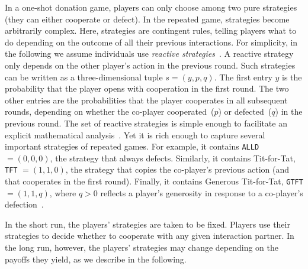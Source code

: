 \documentclass[11pt]{article}
\def\alld{\texttt{ALLD}}
\def\tft{\texttt{TFT}}
\def\gtft{\texttt{GTFT}}
\def\strategy{s}
\theoremstyle{plainCl1}
\theoremstyle{plainCl2}
\begin{document}

In a one-shot donation game, players can only choose among two pure strategies (they can either cooperate or defect).
In the repeated game, strategies become arbitrarily complex. 
Here, strategies are contingent rules, telling players what to do depending on the outcome of all their previous interactions. 
For simplicity, in the following we assume individuals use {\it reactive strategies}~\citep{Nowak1992tit}. 
A reactive strategy only depends on the other player's action in the previous round. 
Such strategies can be written as a three-dimensional tuple \(\strategy=(y, p,q)\).
The first entry \(y\) is the probability that the player opens with cooperation in the first round. 
The two other entries are the probabilities that the player cooperates in all subsequent rounds, depending on whether the co-player cooperated~($p$) or defected~($q$) in the previous round. 
The set of reactive strategies is simple enough to facilitate an explicit mathematical analysis~\citep{hofbauer1998evolutionary}. 
Yet it is rich enough to capture several important strategies of repeated games. 
For example, it contains \alld{} $=\!(0,0,0)$, the strategy that always defects. 
Similarly, it contains Tit-for-Tat, \tft{} $=\!(1,1,0)$, the strategy that copies the co-player's previous action (and that cooperates in the first round). 
Finally, it contains Generous Tit-for-Tat, \gtft $=\!(1,1,q)$, where $q\!>\!0$ reflects a player's generosity in response to a co-player's defection~\citep{molander:jcr:1985,Nowak1992tit}.  

In the short run, the players' strategies are taken to be fixed.
Players use their strategies to decide whether to cooperate with any given interaction partner. 
In the long run, however, the players' strategies may change depending on the payoffs they yield, as we describe in the following.\\
 
\end{document}
